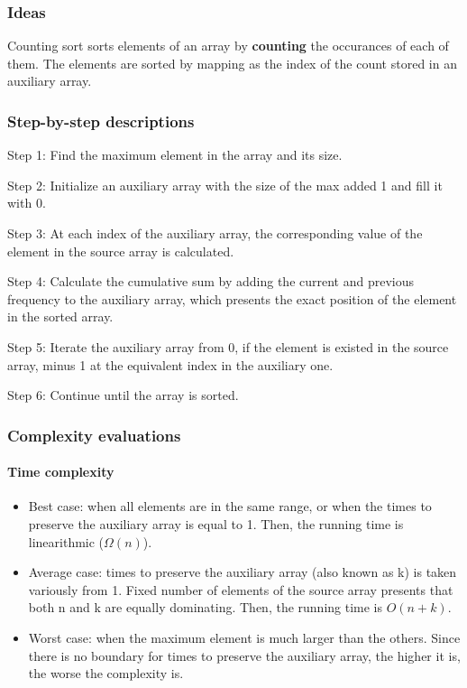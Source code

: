 \documentclass{article}
\newcommand\tab[1][0.5cm]{\hspace*{#1}}
\begin{document}
\subsubsection{Ideas}

\tab Counting sort sorts elements of an array by \textbf{counting} the occurances of each of them. The elements are sorted by mapping as the index of the count stored in an auxiliary array.

\subsubsection{Step-by-step descriptions}

\tab Step 1: Find the maximum element in the array and its size.
\smallskip

Step 2: Initialize an auxiliary array with the size of the max added 1 and fill it with 0.
\smallskip

Step 3: At each index of the auxiliary array, the corresponding value of the element in the source array is calculated.
\smallskip

Step 4: Calculate the cumulative sum by adding the current and previous frequency to the auxiliary array, which presents the exact position of the element in the sorted array.
\smallskip

Step 5: Iterate the auxiliary array from 0, if the element is existed in the source array, minus 1 at the equivalent index in the auxiliary one.
\smallskip

Step 6: Continue until the array is sorted.

\subsubsection{Complexity evaluations}

\paragraph{\tab Time complexity}

\begin{itemize}
    \item Best case: when all elements are in the same range, or when the times to preserve the auxiliary array is equal to 1. Then, the running time is linearithmic ($\Omega(n)$).
    
    \item Average case: times to preserve the auxiliary array (also known as k) is taken variously from 1. Fixed number of elements of the source array presents that both n and k are equally dominating. Then, the running time is $O(n+k)$.
    
    \item Worst case: when the maximum element is much larger than the others. Since there is no boundary for times to preserve the auxiliary array, the higher it is, the worse the complexity is.
\end{itemize}
\end{document}
